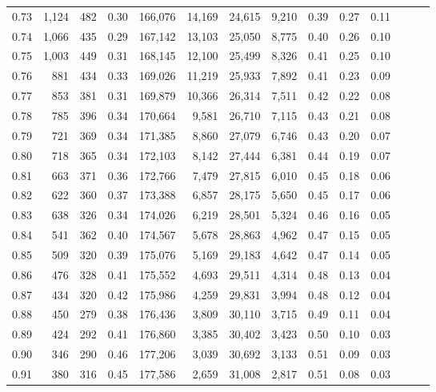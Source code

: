 \begin{tabular}{rrrrrrrrrrrrrr}
0.73 &  1,124 &    482 &  0.30 &  166,076 &   14,169 &  24,615 &   9,210 &  0.39 &  0.27 &      0.11 \\
0.74 &  1,066 &    435 &  0.29 &  167,142 &   13,103 &  25,050 &   8,775 &  0.40 &  0.26 &      0.10 \\
0.75 &  1,003 &    449 &  0.31 &  168,145 &   12,100 &  25,499 &   8,326 &  0.41 &  0.25 &      0.10 \\
0.76 &    881 &    434 &  0.33 &  169,026 &   11,219 &  25,933 &   7,892 &  0.41 &  0.23 &      0.09 \\
0.77 &    853 &    381 &  0.31 &  169,879 &   10,366 &  26,314 &   7,511 &  0.42 &  0.22 &      0.08 \\
0.78 &    785 &    396 &  0.34 &  170,664 &    9,581 &  26,710 &   7,115 &  0.43 &  0.21 &      0.08 \\
0.79 &    721 &    369 &  0.34 &  171,385 &    8,860 &  27,079 &   6,746 &  0.43 &  0.20 &      0.07 \\
0.80 &    718 &    365 &  0.34 &  172,103 &    8,142 &  27,444 &   6,381 &  0.44 &  0.19 &      0.07 \\
0.81 &    663 &    371 &  0.36 &  172,766 &    7,479 &  27,815 &   6,010 &  0.45 &  0.18 &      0.06 \\
0.82 &    622 &    360 &  0.37 &  173,388 &    6,857 &  28,175 &   5,650 &  0.45 &  0.17 &      0.06 \\
0.83 &    638 &    326 &  0.34 &  174,026 &    6,219 &  28,501 &   5,324 &  0.46 &  0.16 &      0.05 \\
0.84 &    541 &    362 &  0.40 &  174,567 &    5,678 &  28,863 &   4,962 &  0.47 &  0.15 &      0.05 \\
0.85 &    509 &    320 &  0.39 &  175,076 &    5,169 &  29,183 &   4,642 &  0.47 &  0.14 &      0.05 \\
0.86 &    476 &    328 &  0.41 &  175,552 &    4,693 &  29,511 &   4,314 &  0.48 &  0.13 &      0.04 \\
0.87 &    434 &    320 &  0.42 &  175,986 &    4,259 &  29,831 &   3,994 &  0.48 &  0.12 &      0.04 \\
0.88 &    450 &    279 &  0.38 &  176,436 &    3,809 &  30,110 &   3,715 &  0.49 &  0.11 &      0.04 \\
0.89 &    424 &    292 &  0.41 &  176,860 &    3,385 &  30,402 &   3,423 &  0.50 &  0.10 &      0.03 \\
0.90 &    346 &    290 &  0.46 &  177,206 &    3,039 &  30,692 &   3,133 &  0.51 &  0.09 &      0.03 \\
0.91 &    380 &    316 &  0.45 &  177,586 &    2,659 &  31,008 &   2,817 &  0.51 &  0.08 &      0.03 \\

\end{tabular}

